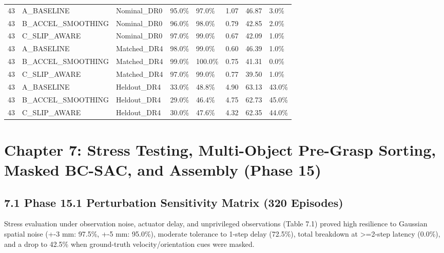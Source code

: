 \documentclass[11pt,a4paper,oneside]{book}
\begin{document}
\begin{longtable}{l l l l l l l l}
43 & A\_BASELINE & Nominal\_DR0 & 95.0\% & 97.0\% & 1.07 & 46.87 & 3.0\% \\
43 & B\_ACCEL\_SMOOTHING & Nominal\_DR0 & 96.0\% & 98.0\% & 0.79 & 42.85 & 2.0\% \\
43 & C\_SLIP\_AWARE & Nominal\_DR0 & 97.0\% & 99.0\% & 0.67 & 42.09 & 1.0\% \\
43 & A\_BASELINE & Matched\_DR4 & 98.0\% & 99.0\% & 0.60 & 46.39 & 1.0\% \\
43 & B\_ACCEL\_SMOOTHING & Matched\_DR4 & 99.0\% & 100.0\% & 0.75 & 41.31 & 0.0\% \\
43 & C\_SLIP\_AWARE & Matched\_DR4 & 97.0\% & 99.0\% & 0.77 & 39.50 & 1.0\% \\
43 & A\_BASELINE & Heldout\_DR4 & 33.0\% & 48.8\% & 4.90 & 63.13 & 43.0\% \\
43 & B\_ACCEL\_SMOOTHING & Heldout\_DR4 & 29.0\% & 46.4\% & 4.75 & 62.73 & 45.0\% \\
43 & C\_SLIP\_AWARE & Heldout\_DR4 & 30.0\% & 47.6\% & 4.32 & 62.35 & 44.0\% \\
\bottomrule \end{longtable}
\chapter{Chapter 7: Stress Testing, Multi-Object Pre-Grasp Sorting, Masked BC-SAC, and Assembly (Phase 15)}
\section{7.1 Phase 15.1 Perturbation Sensitivity Matrix (320 Episodes)}
Stress evaluation under observation noise, actuator delay, and unprivileged observations (Table 7.1) proved high resilience to Gaussian spatial noise (+-3 mm: 97.5\%, +-5 mm: 95.0\%), moderate tolerance to 1-step delay (72.5\%), total breakdown at >=2-step latency (0.0\%), and a drop to 42.5\% when ground-truth velocity/orientation cues were masked.
\end{document}
